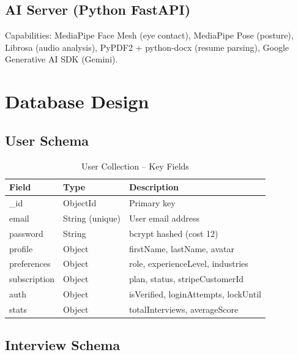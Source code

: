 \subsection{AI Server (Python FastAPI)}
Capabilities: MediaPipe Face Mesh (eye contact), MediaPipe Pose (posture), Librosa (audio analysis), PyPDF2 + python-docx (resume parsing), Google Generative AI SDK (Gemini).

\section{Database Design}

\subsection{User Schema}

\begin{table}[H]
\centering
\caption{User Collection -- Key Fields}
\vspace{6pt}
\begin{tabularx}{\textwidth}{|L{2.8cm}|L{2.5cm}|X|}
\hline
\textbf{Field} & \textbf{Type} & \textbf{Description} \\
\hline
\_id & ObjectId & Primary key \\
\hline
email & String (unique) & User email address \\
\hline
password & String & bcrypt hashed (cost 12) \\
\hline
profile & Object & firstName, lastName, avatar \\
\hline
preferences & Object & role, experienceLevel, industries \\
\hline
subscription & Object & plan, status, stripeCustomerId \\
\hline
auth & Object & isVerified, loginAttempts, lockUntil \\
\hline
stats & Object & totalInterviews, averageScore \\
\hline
\end{tabularx}
\label{tab:userschema}
\end{table}

\subsection{Interview Schema}

